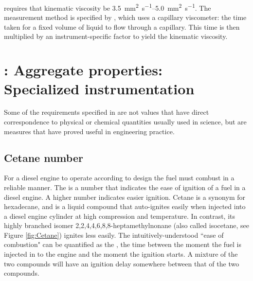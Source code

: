  requires that kinematic viscosity be
\SIrange{3.5}{5.0}{\milli\metre\squared\per\second}. The measurement method is
specified by , which uses a capillary viscometer: the time taken
for a fixed volume of liquid to flow through a capillary. This time is then
multiplied by an instrument-specific factor to yield the kinematic viscosity.

\section[\std{SANS 1935}: Aggregate properties: Specialized
in\-stru\-mentation]{: Aggregate properties: \\ Specialized
in\-stru\-mentation}

Some of the requirements specified in  are not values that have
direct correspondence to physical or chemical quantities usually used in
science, but are measures that have proved useful in engineering practice.

\subsection{Cetane number}

For a diesel engine to operate according to design the fuel must combust in a
reliable manner. The  is a number that indicates the ease
of ignition of a fuel in a diesel engine. A higher number indicates easier
ignition. Cetane is a synonym for hexadecane, and is a liquid compound that
auto-ignites easily when injected into a diesel engine cylinder at high
compression and temperature. In contrast, its highly branched isomer
2,2,4,4,6,8,8-heptamethylnonane (also called isocetane, see Figure
\ref{fig:Cetane}) ignites less easily. The intuitively-understood ``ease of
combustion" can be quantified as the , the time between
the moment the fuel is injected in to the engine and the moment the ignition
starts. A mixture of the two compounds will have an ignition delay somewhere
between that of the two compounds.

